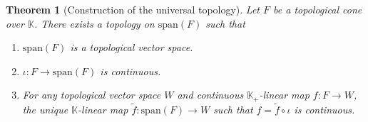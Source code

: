 \documentclass[a4paper,11pt]{article}
\numberwithin{equation}{section}
\theoremstyle{definition}
\theoremstyle{plain}
\newtheorem{Theorem}[Definition]{Theorem}
\newcommand{\spn}{\mathrm{span}}
\begin{document}
\begin{Theorem}[Construction of the universal topology]\label{prop: universal topology of span}
    Let $F$ be a topological cone over $\mathbb{K}$. There exists a topology on $\spn(F)$ such that
    \begin{enumerate}
        \item $\spn(F)$ is a topological vector space.
        \item $\iota: F \longrightarrow \spn(F)$ is continuous.
        \item For any topological vector space $W$ and continuous $\mathbb{K}_{+}$-linear map $f: F \longrightarrow W$, the unique $\mathbb{K}$-linear map $\tilde{f}: \spn(F) \longrightarrow W$ such that $f = \tilde{f} \circ \iota$ is continuous.
    \end{enumerate}
\end{Theorem}
\end{document}
